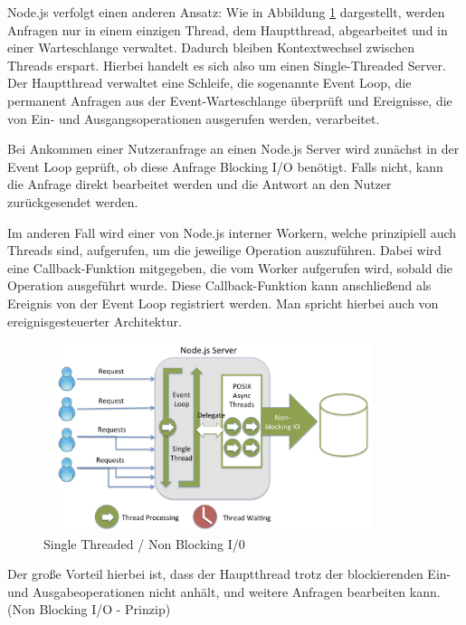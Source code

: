 \newpage

\noindent
Node.js verfolgt einen anderen Ansatz: Wie in Abbildung \ref{SingleThreaded} dargestellt, werden Anfragen nur in einem einzigen Thread, dem Hauptthread, abgearbeitet und in einer Warteschlange verwaltet. Dadurch bleiben Kontextwechsel zwischen Threads erspart. Hierbei handelt es sich also um einen Single-Threaded Server. Der Hauptthread verwaltet eine Schleife, die sogenannte Event Loop, die permanent Anfragen aus der Event-Warteschlange überprüft und Ereignisse, die von Ein- und Ausgangsoperationen ausgerufen werden, verarbeitet.
\newline

\noindent
Bei Ankommen einer Nutzeranfrage an einen Node.js Server wird zunächst in der Event Loop geprüft, ob diese Anfrage Blocking I/O benötigt. Falls nicht, kann die Anfrage direkt bearbeitet werden und die Antwort an den Nutzer zurückgesendet werden. 
\newline

\noindent
Im anderen Fall wird einer von Node.js interner Workern, welche prinzipiell auch Threads sind, aufgerufen, um die jeweilige Operation auszuführen. Dabei wird eine Callback-Funktion mitgegeben, die vom Worker aufgerufen wird, sobald die Operation ausgeführt wurde. Diese Callback-Funktion kann anschließend als Ereignis von der Event Loop registriert werden. Man spricht hierbei auch von ereignisgesteuerter Architektur. \cite{Node1.4}
\newline
 
\begin{figure}[tbt]
\centering
\includegraphics[width=10cm, height = 5.5cm]{images/nodejs_nodethreading.png}
\caption[Single Threaded / Non Blocking I/0]{Single Threaded / Non Blocking I/0 \cite{Node1.1}}
\label{SingleThreaded}
\end{figure}
 

\noindent
Der große Vorteil hierbei ist, dass der Hauptthread trotz der blockierenden Ein- und Aus\-gabeoperationen nicht anhält, und weitere Anfragen bearbeiten kann. (Non Blocking I/O - Prinzip) 
\newline

